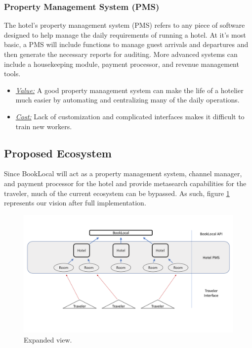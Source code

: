 \documentclass{article}
\begin{document}
\subsubsection{Property Management System (PMS)}
The hotel's property management system (PMS) refers to any piece of software designed to help manage the daily requirements of running a hotel. At it's most basic, a PMS will include functions to manage guest arrivals and departures and then generate the necessary reports for auditing. More advanced systems can include a housekeeping module, payment processor, and revenue management tools. 
\begin{itemize}
 \item \underline{\textit{Value:}} A good property management system can make the life of a hotelier much easier by automating and centralizing many of the daily operations. 
  \item \underline{\textit{Cost:}} Lack of customization and complicated interfaces makes it difficult to train new workers. 
  \end{itemize}

\newpage

\subsection{Proposed Ecosystem}
Since BookLocal will act as a property management system, channel manager, and payment processor for the hotel and provide metasearch capabilities for the traveler, much of the current ecosystem can be bypassed. As such, figure \ref{bl} represents our vision after full implementation. 

\begin{figure}[H]
\centering
\includegraphics[width = .9\textwidth]{bookLocal_ecosystem2.pdf}
\caption{Expanded view.}
\label{bl}
\end{figure}
\end{document}
